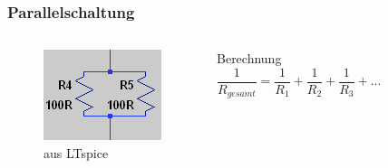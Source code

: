 \begin{frame}
  \frametitle{Parallelschaltung}
  \begin{columns}
    \begin{center}
      \begin{figure}
        \includegraphics[width=\textwidth,height=.75\textheight,keepaspectratio]{e04/Parallel.png}
        \caption{aus LTspice}
      \end{figure}
    \end{center}
    \pause
    \begin{block}{Berechnung}
      $$\frac{1}{R_{gesamt}} = \frac{1}{R_1} + \frac{1}{R_2} + \frac{1}{R_3} + ...$$
    \end{block}
  \end{columns}
\end{frame}

